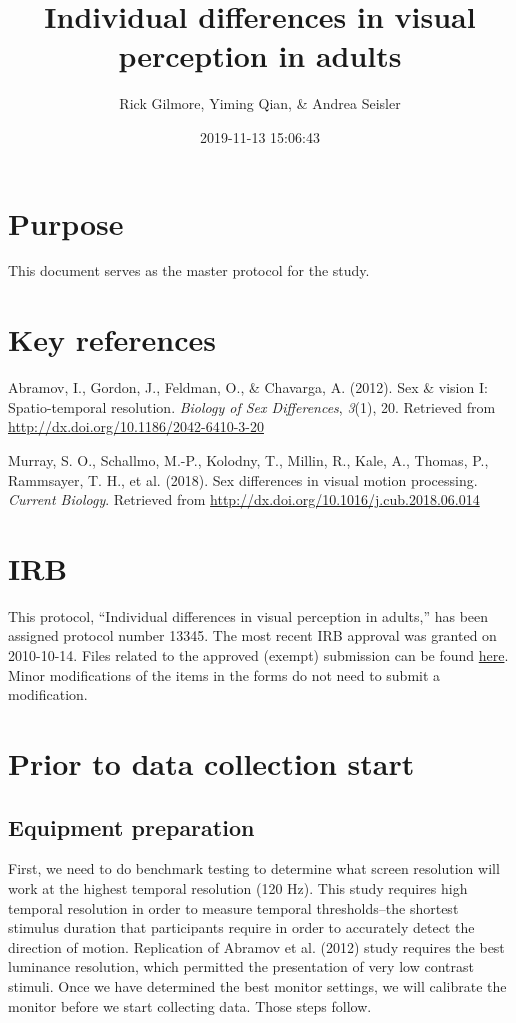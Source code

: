\documentclass[]{article}
\title{Individual differences in visual perception in adults}
\author{Rick Gilmore, Yiming Qian, \& Andrea Seisler}
\date{2019-11-13 15:06:43}
\begin{document}
\maketitle

{
\setcounter{tocdepth}{3}
\tableofcontents
}
\section{Purpose}\label{purpose}

This document serves as the master protocol for the study.

\section{Key references}\label{key-references}

Abramov, I., Gordon, J., Feldman, O., \& Chavarga, A. (2012). Sex \&
vision I: Spatio-temporal resolution. \emph{Biology of Sex Differences},
\emph{3}(1), 20. Retrieved from
\url{http://dx.doi.org/10.1186/2042-6410-3-20}

Murray, S. O., Schallmo, M.-P., Kolodny, T., Millin, R., Kale, A.,
Thomas, P., Rammsayer, T. H., et al. (2018). Sex differences in visual
motion processing. \emph{Current Biology}. Retrieved from
\url{http://dx.doi.org/10.1016/j.cub.2018.06.014}

\section{IRB}\label{irb}

This protocol, ``Individual differences in visual perception in
adults,'' has been assigned protocol number 13345. The most recent IRB
approval was granted on 2010-10-14. Files related to the approved
(exempt) submission can be found \href{../irb/2019-10-24}{here}. Minor
modifications of the items in the forms do not need to submit a
modification.

\section{Prior to data collection
start}\label{prior-to-data-collection-start}

\subsection{Equipment preparation}\label{equipment-preparation}

First, we need to do benchmark testing to determine what screen
resolution will work at the highest temporal resolution (120 Hz). This
study requires high temporal resolution in order to measure temporal
thresholds--the shortest stimulus duration that participants require in
order to accurately detect the direction of motion. Replication of
Abramov et al. (2012) study requires the best luminance resolution,
which permitted the presentation of very low contrast stimuli. Once we
have determined the best monitor settings, we will calibrate the monitor
before we start collecting data. Those steps follow.
\end{document}
